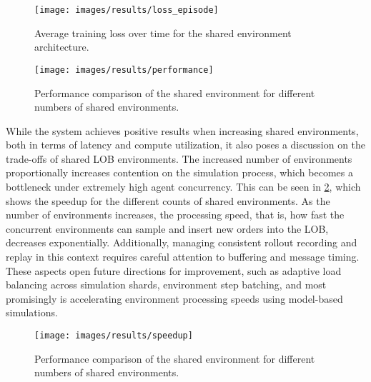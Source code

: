 \begin{figure}[htbp]
    \begin{minipage}[t]{0.48\textwidth}
        \centering
        \texttt{[image: images/results/loss\_episode]}
        \caption{Average training loss over time for the shared environment architecture.}
        \label{fig:loss}
    \end{minipage}
    \hfill
    \begin{minipage}[t]{0.48\textwidth}
        \centering
        \texttt{[image: images/results/performance]}
        \caption{Performance comparison of the shared environment for different numbers of shared environments.}
        \label{fig:performance}
    \end{minipage}
\end{figure}

While the system achieves positive results when increasing shared environments, both in terms of latency and compute utilization,
it also poses a discussion on the trade-offs of shared LOB environments.
The increased number of environments proportionally increases contention on the simulation process, which becomes a bottleneck under extremely high agent concurrency.
This can be seen in \cref{fig:speedup}, which shows the speedup for the different counts of shared environments.
As the number of environments increases, the processing speed, that is, how fast the concurrent environments can sample and insert new orders into the LOB,
decreases exponentially.
Additionally, managing consistent rollout recording and replay in this context requires careful attention to buffering and message timing.
These aspects open future directions for improvement, such as adaptive load balancing across simulation shards, environment step batching,
and most promisingly is accelerating environment processing speeds using model-based simulations.

\begin{figure}
    \centering
    \texttt{[image: images/results/speedup]}
    \caption{Performance comparison of the shared environment for different numbers of shared environments.}
    \label{fig:speedup}
\end{figure}

